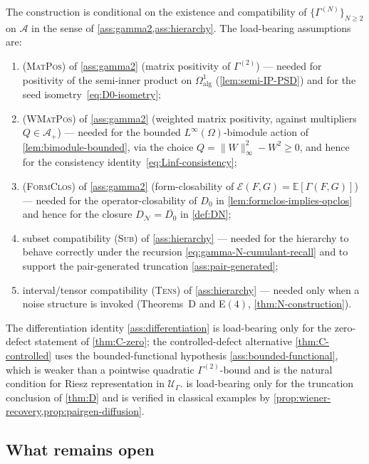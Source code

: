 \documentclass[11pt,reqno]{amsart}
\theoremstyle{plain}
\theoremstyle{definition}
\theoremstyle{remark}
\newcommand{\E}{\mathbb{E}}
\newcommand{\cA}{\mathcal A}
\newcommand{\cE}{\mathcal E}
\newcommand{\cN}{\mathcal N}
\newcommand{\cU}{\mathcal U}
\newcommand{\dN}{D_{\cN}}
\begin{document}
The construction is conditional on the existence and
compatibility of $\{\Gamma^{(N)}\}_{N\ge 2}$ on $\cA$ in the
sense of \cref{ass:gamma2,ass:hierarchy}. The
load-bearing assumptions are:
\begin{enumerate}
\item[$(\mathrm L_{1})$] \textsc{(MatPos)} of \cref{ass:gamma2}
(matrix positivity of $\Gamma^{(2)}$) --- needed for
positivity of the semi-inner product on
$\Omega^{1}_{\mathrm{alg}}$ (\cref{lem:semi-IP-PSD}) and for
the seed isometry~\eqref{eq:D0-isometry};
\item[$(\mathrm L_{2})$] \textsc{(WMatPos)} of \cref{ass:gamma2}
(weighted matrix positivity, against multipliers $Q\in\cA_{+}$) ---
needed for the bounded $L^{\infty}(\Omega)$-bimodule action of
\cref{lem:bimodule-bounded}, via the choice
$Q=\|W\|_{\infty}^{2}-W^{2}\ge 0$, and hence for the consistency
identity~\eqref{eq:Linf-consistency};
\item[$(\mathrm L_{3})$] \textsc{(FormClos)} of \cref{ass:gamma2}
(form-closability of $\cE(F,G)=\E[\Gamma(F,G)]$) --- needed for
the operator-closability of $D_{0}$ in
\cref{lem:formclos-implies-opclos} and hence for the closure
$\dN=\overline{D_{0}}$ in \cref{def:DN};
\item[$(\mathrm L_{4})$] subset compatibility \textsc{(Sub)}
of \cref{ass:hierarchy} --- needed for the hierarchy to behave
correctly under the recursion
\eqref{eq:gamma-N-cumulant-recall} and to support the
pair-generated truncation \cref{ass:pair-generated};
\item[$(\mathrm L_{5})$] interval/tensor compatibility
\textsc{(Tens)} of \cref{ass:hierarchy} --- needed only when a
noise structure is invoked (Theorems~D and E$(\mathrm 4)$,
\cref{thm:N-construction}).
\end{enumerate}
The differentiation identity \cref{ass:differentiation} is
load-bearing only for the zero-defect statement of
\cref{thm:C-zero}; the controlled-defect alternative
\cref{thm:C-controlled} uses the bounded-functional
hypothesis \cref{ass:bounded-functional}, which is weaker than
a pointwise quadratic $\Gamma^{(2)}$-bound and is the natural
condition for Riesz representation in $\cU_{\Gamma}$.
 is load-bearing only for the
truncation conclusion of \cref{thm:D} and is verified in
classical examples by \cref{prop:wiener-recovery,prop:pairgen-diffusion}.

\subsection{What remains open}\label{sec:disc-open}
\end{document}
